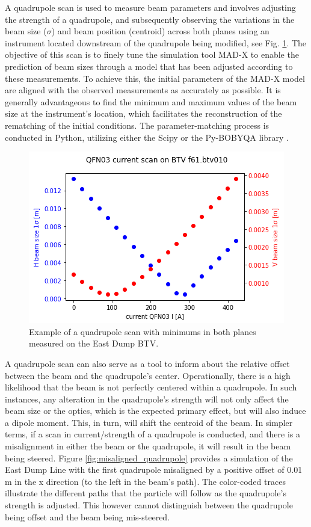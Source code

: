 A quadrupole scan is used to measure beam parameters and involves adjusting the strength of a quadrupole, and subsequently observing the variations in the beam size ($\sigma$) and beam position (centroid) across both planes using an instrument located downstream of the quadrupole being modified, see Fig. \ref{fig:quad_scan_example}. The objective of this scan is to finely tune the simulation tool MAD-X \cite{noauthor_mad_nodate} to enable the prediction of beam sizes through a model that has been adjusted according to these measurements. To achieve this, the initial parameters of the MAD-X model are aligned with the observed measurements as accurately as possible. It is generally advantageous to find the minimum and maximum values of the beam size at the instrument's location, which facilitates the reconstruction of the rematching of the initial conditions. The parameter-matching process is conducted in Python, utilizing either the Scipy or the Py-BOBYQA library \cite{cartis_improving_2019, cartis_escaping_2022}.

\begin{figure}[htbp]
\centering
\includegraphics[width=0.5\linewidth]{03_Empirical_Measurements/images/quadrupole_scan_east_dump.png}
\caption{Example of a quadrupole scan with minimums in both planes measured on the East Dump BTV.}
\label{fig:quad_scan_example}
\end{figure}

A quadrupole scan can also serve as a tool to inform about the relative offset between the beam and the quadrupole's center. Operationally, there is a high likelihood that the beam is not perfectly centered within a quadrupole. In such instances, any alteration in the quadrupole's strength will not only affect the beam size or the optics, which is the expected primary effect, but will also induce a dipole moment. This, in turn, will shift the centroid of the beam. In simpler terms, if a scan in current/strength of a quadrupole is conducted, and there is a misalignment in either the beam or the quadrupole, it will result in the beam being steered. Figure \ref{fig:misaligned_quadrupole} provides a simulation of the East Dump Line with the first quadrupole misaligned by a positive offset of 0.01 m in the x direction (to the left in the beam's path). The color-coded traces illustrate the different paths that the particle will follow as the quadrupole's strength is adjusted. This however cannot distinguish between the quadrupole being offset and the beam being mis-steered.
\\

